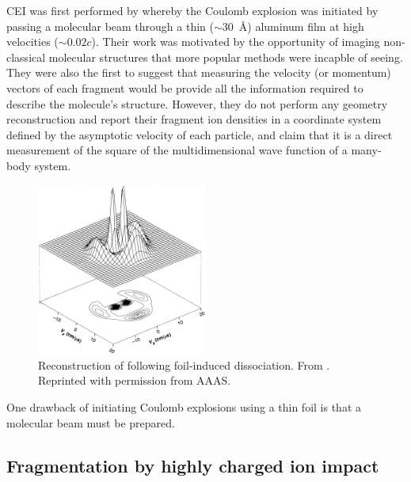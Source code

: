 CEI was first performed by \citet{Vager89} whereby the Coulomb explosion was initiated by passing a molecular beam through a thin ($\sim$\SI{30}{\angstrom}) aluminum film at high velocities ($\sim0.02c$). Their work was motivated by the opportunity of imaging non-classical molecular structures that more popular methods were incapble of seeing. They were also the first to suggest that measuring the velocity (or momentum) vectors of each fragment would be provide all the information required to describe the molecule's structure. However, they do not perform any geometry reconstruction and report their fragment ion densities in a coordinate system defined by the asymptotic velocity of each particle, and claim that it is a direct measurement of the square of the multidimensional wave function of a many-body system.

\begin{figure}
  \centering
  \includegraphics[width=0.5\textwidth]{gfx/VagerPseudoGeometry}
  \caption[Reconstruction of  following foil-induced dissociation.]
  {Reconstruction of  following foil-induced dissociation. From \citet{Vager89}. Reprinted with permission from AAAS.}
\end{figure}


One drawback of initiating Coulomb explosions using a thin foil is that a molecular beam must be prepared.

\subsection{Fragmentation by highly charged ion impact}

